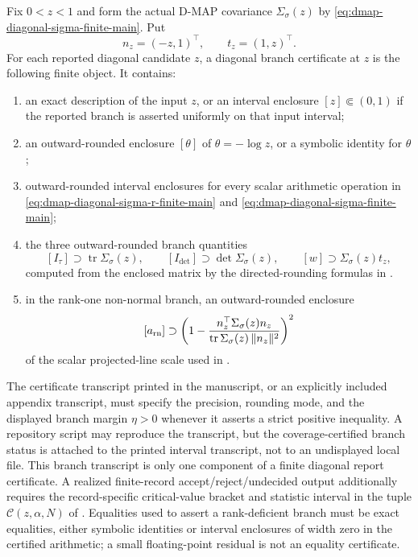 \begin{definition}\label{def:dmap-diagonal-rank-certificate-main}
Fix \(0<z<1\) and form the actual D-MAP covariance
\(\Sigma_\sigma(z)\) by \eqref{eq:dmap-diagonal-sigma-finite-main}.  Put
\[
n_z=(-z,1)^\top,\qquad t_z=(1,z)^\top .
\]
For each reported diagonal candidate \(z\), a diagonal branch certificate at
\(z\) is the following finite object.
It contains:
\begin{enumerate}[label=\textup{(\arabic*)},leftmargin=2.4em,itemsep=0.2em]
\item an exact description of the input \(z\), or an interval enclosure
\([z]\Subset(0,1)\) if the reported branch is asserted uniformly on that
input interval;
\item an outward-rounded enclosure \([\theta]\) of
\(\theta=-\log z\), or a symbolic identity for \(\theta\);
\item outward-rounded interval enclosures for every scalar arithmetic operation
in \eqref{eq:dmap-diagonal-sigma-r-finite-main} and
\eqref{eq:dmap-diagonal-sigma-finite-main};
\item the three outward-rounded branch quantities
\[
[I_{\tau}]\supset \operatorname{tr}\Sigma_\sigma(z),\qquad
[I_{\det}]\supset \det\Sigma_\sigma(z),\qquad
[w]\supset \Sigma_\sigma(z)t_z,
\]
computed from the enclosed matrix by the directed-rounding formulas in
.
\item in the rank-one non-normal branch, an outward-rounded enclosure
\[
[a_{\rm rn}]
\supset
\left(
1-\frac{n_z^\top\Sigma_\sigma(z)n_z}
{\operatorname{tr}\Sigma_\sigma(z)\,\|n_z\|^2}
\right)^2
\]
of the scalar projected-line scale used in
.
\end{enumerate}
The certificate transcript printed in the manuscript, or an explicitly
included appendix transcript, must specify the precision, rounding mode, and
the displayed branch margin \(\eta>0\) whenever it asserts a strict positive
inequality.  A repository script may reproduce the transcript, but the
coverage-certified branch status is attached to the printed interval
transcript, not to an undisplayed local file.  This branch transcript is only
one component of a finite diagonal report certificate.  A realized
finite-record accept/reject/undecided output additionally requires the
record-specific critical-value bracket and statistic interval in the tuple
\(\mathcal C(z,\alpha,N)\) of
.  Equalities used to assert a
rank-deficient branch must be exact equalities, either symbolic identities or
interval enclosures of width zero in the certified arithmetic; a small
floating-point residual is not an equality certificate.


\end{definition}
